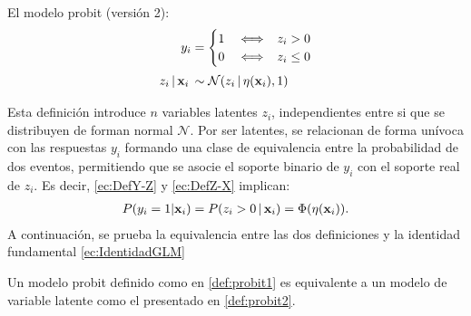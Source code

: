 \documentclass[../Main/Main.tex]{subfiles}
\begin{document}
\begin{definition} El modelo probit (versión 2): \label{def:probit2}
\begin{align}
y_i &= 
	\begin{cases}
		1 & \iff \enspace z_i > 0 \\									0 & \iff \enspace z_i \leq 0
	\end{cases} \label{ec:DefY-Z} \\[2pt]
z_i\,|\,\mathbf{x}_i\, &\sim \mathcal{N}(z_i\,|\,\eta(\mathbf{x}_i),1) \label{ec:DefZ-X}
\end{align}
\end{definition}
Esta definición introduce $n$ variables latentes $z_i$, independientes entre si que se distribuyen de forman normal $\mathcal{N}$. Por ser latentes, se relacionan de forma unívoca con las respuestas $y_i$ formando una clase de equivalencia entre la probabilidad de dos eventos, permitiendo que se asocie el soporte binario de $y_i$ con el soporte real de $z_i$. Es decir, \eqref{ec:DefY-Z} y \eqref{ec:DefZ-X} implican:
\begin{align}
	P(y_i = 1 |\mathbf{x}_i) = P(z_i > 0 \,|\, \mathbf{x}_i) = \Phi(\eta(\mathbf{x}_i)). 	\label{ec:IdentidadGLM}
\end{align}
A continuación, se prueba la equivalencia entre las dos definiciones y la identidad fundamental \eqref{ec:IdentidadGLM}\\

\begin{theorem} \label{teo:Defs}
Un modelo probit definido como en \ref{def:probit1} es equivalente a un modelo de variable latente como el presentado en \ref{def:probit2}.
\end{theorem}
\end{document}
